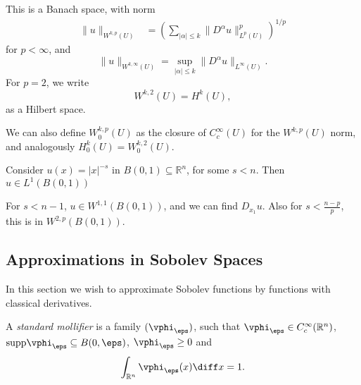 \documentclass[12pt]{article}
\begin{document}
This is a Banach space, with norm
\begin{align}
	\|u\|_{W^{k, p}(U)} &= \left( \sum_{|\alpha| \leq k} \|D^\alpha u\|_{L^p(U)}^p \right)^{1/p}
\end{align}
for $p < \infty$, and
\[
\|u\|_{W^{k, \infty}(U)} = \sup_{|\alpha| \leq k} \|D^\alpha u\|_{L^\infty(U)}.
\]
For $p = 2$, we write
\[
W^{k, 2}(U) = H^{k}(U),
\]
as a Hilbert space.

We can also define $W^{k, p}_0(U)$ as the closure of $C_c^{\infty}(U)$ for the $W^{k, p}(U)$ norm, and analogously $H^{k}_0(U) = W_0^{k, 2}(U)$.

\begin{exbox}
	Consider $u(x) = |x|^{-s}$ in $B(0, 1) \subseteq \mathbb{R}^n$, for some $s < n$. Then $u \in L^1(B(0, 1))$

	For $s < n-1$, $u \in W^{1, 1}(B(0,1))$, and we can find $D_{x_1} u$. Also for $s < \frac{n-p}{p}$, this is in $W^{2, p}(B(0, 1))$.
\end{exbox}


\subsection{Approximations in Sobolev Spaces}%
\label{sub:approx}

In this section we wish to approximate Sobolev functions by functions with classical derivatives.

\begin{definition}
	A \emph{standard mollifier} is a family $(\vphi_\eps)$, such that $\vphi_\eps \in C_c^{\infty}(\mathbb{R}^{n})$, $\mathrm{supp} \vphi_\eps \subseteq B(0, \eps)$, $\vphi_\eps \geq 0$ and
	\[
	\int_{\mathbb{R}^n} \vphi_{\eps}(x) \diff x = 1.
	\]
\end{definition}
\end{document}
